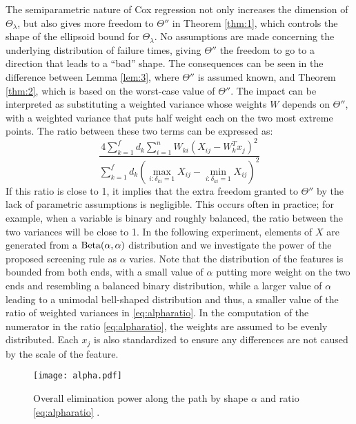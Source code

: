 The semiparametric nature of Cox regression not only increases the dimension of $\Theta_\lambda$, but also gives more freedom to $\Theta''$ in Theorem \ref{thm:1}, which controls the shape of the ellipsoid bound for $\Theta_\lambda$. No assumptions are made concerning the underlying distribution of failure times, giving $\Theta''$ the freedom to go to a direction that leads to a ``bad'' shape. The consequences can be seen in the difference between Lemma \ref{lem:3}, where $\Theta''$ is assumed known, and Theorem \ref{thm:2}, which is based on the worst-case value of $\Theta''$. The impact can be interpreted as substituting a weighted variance whose weights $W$ depends on $\Theta''$, with a weighted variance that puts half weight each on the two most extreme points. The ratio between these two terms can be expressed as:
\begin{equation}
    \label{eq:alpharatio}
    \frac{4\sum_{k=1}^fd_k\sum_{i=1}^nW_{ki}\left(X_{ij}-W_k^Tx_j\right)^2}{\sum_{k=1}^fd_k\left(\max_{i:\delta_{ki}=1}X_{ij}-\min_{i:\delta_{ki}=1}X_{ij}\right)^2}
\end{equation}
If this ratio is close to 1, it implies that the extra freedom granted to $\Theta''$ by the lack of parametric assumptions is negligible. This occurs often in practice; for example, when a variable is binary and roughly balanced, the ratio between the two variances will be close to 1. In the following experiment, elements of $X$ are generated from a $\textnormal{Beta}(\alpha,\alpha)$ distribution and we investigate the power of the proposed screening rule as $\alpha$ varies. Note that the distribution of the features is bounded from both ends, with a small value of $\alpha$ putting more weight on the two ends and resembling a balanced binary distribution, while a larger value of $\alpha$ leading to a unimodal bell-shaped distribution and thus, a smaller value of the ratio of weighted variances in \eqref{eq:alpharatio}. In the computation of the numerator in the ratio \eqref{eq:alpharatio}, the weights are assumed to be evenly distributed. Each $x_j$ is also standardized to ensure any differences are not caused by the scale of the feature. 

\begin{figure}[ht]
    \centering
    \texttt{[image: alpha.pdf]}  
    \caption[Overall power by shape $\alpha$ and ratio \eqref{eq:alpharatio}]{Overall elimination power along the path by shape $\alpha$ and ratio \eqref{eq:alpharatio} \label{Fig:alpha}.}
\end{figure}

